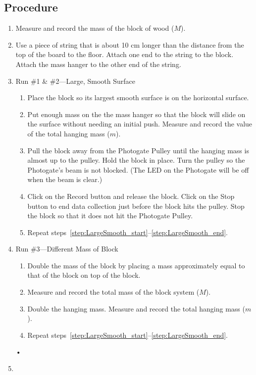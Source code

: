 \documentclass[main.tex]{subfiles}
\begin{document}
\subsection*{Procedure}
\begin{enumerate}
\item
Measure and record the mass of the block of wood ($M$).
\item
Use a piece of string that is about 10 cm longer than the distance from the top of the board to the floor. Attach one end to the string to the block. Attach the mass hanger to the other end of the string.
\item \label{step:LargeSmooth}
Run \#1 \& \#2---Large, Smooth Surface
\begin{enumerate}
\item 
Place the block so its largest smooth surface is on the horizontal surface.
\item
Put enough mass on the the mass hanger so that the block will slide on the surface without needing an initial push. Measure and record the value of the total hanging mass ($m$).
\item\label{step:LargeSmooth_start}
Pull the block away from the Photogate Pulley until the hanging mass is almost up to the pulley. Hold the block in place. Turn the pulley so the Photogate's beam is not blocked. (The LED on the Photogate will be off when the beam is clear.)
\item \label{step:LargeSmooth_end}
Click on the Record button and release the block. Click on the Stop button to end data collection just before the block hits the pulley. Stop the block so that it does not hit the Photogate Pulley.
\item
Repeat steps~\ref{step:LargeSmooth_start}--\ref{step:LargeSmooth_end}.
\end{enumerate}
\item
Run \#3---Different Mass of Block
\begin{enumerate}
\item
Double the mass of the block by placing a mass approximately equal to that of the block on top of the block.
\item
Measure and record the total mass of the block system ($M$).
\item
Double the hanging mass. Measure and record the total hanging mass ($m$).
\item
Repeat steps~\ref{step:LargeSmooth_start}--\ref{step:LargeSmooth_end}.
\end{enumerate}•
\item

\end{enumerate}
\end{document}
